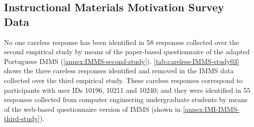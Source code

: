 
\subsection{Instructional Materials Motivation Survey Data}

No one careless response has been identified in 58 responses collected over the second empirical study by means of the paper-based questionnaire of the adapted Portuguese IMMS (\autoref{annex:IMMS-second-study}). \autoref{tab:careless-IMMS-study03} shows the three careless responses identified and removed in the IMMS data collected over the third empirical study. These careless responses correspond to participants with user IDs 10196, 10211 and 10240; and they were identified in 55 responses collected from computer engineering undergraduate students by means of the web-based questionnaire version of IMMS (shown in \autoref{annex:IMI-IMMS-third-study}).

